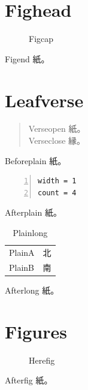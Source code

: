 \documentclass[11pt,a4paper]{ltjsarticle}
\begin{document}
\section{Fighead}
\begin{figure}[H]\centering
{}
\caption{Figcap}
\end{figure}
\noindent Figend 紙。

\clearpage
\section{Leafverse}
\begin{verse}Verseopen 紙。\\Verseclose 縁。\end{verse}
\noindent Beforeplain 紙。
\begin{lstlisting}[basicstyle=\small\ttfamily,numbers=left,caption={Plaincap}]
width = 1
count = 4
\end{lstlisting}
\noindent Afterplain 紙。
\begin{longtable}{ll}
\caption{Plainlong}\\
PlainA & 北 \\ PlainB & 南 \\
\end{longtable}
\noindent Afterlong 紙。
\section{Figures}
\begin{figure}[htbp]\centering
{}
\caption{Herefig}
\end{figure}
\noindent Afterfig 紙。
\end{document}
